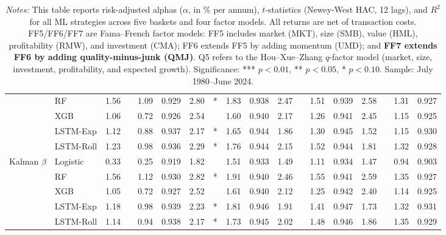 \begin{table}[htbp]
{\begin{tabular}{l l r l r r r l r r r l r r r l r r}
 & RF & 1.56 &  & 1.09 & 0.929 & 2.80 & * & 1.83 & 0.938 & 2.47 &  & 1.51 & 0.939 & 2.58 &  & 1.31 & 0.927 \\
 & XGB & 1.06 &  & 0.72 & 0.926 & 2.54 &  & 1.60 & 0.940 & 2.17 &  & 1.26 & 0.941 & 2.45 &  & 1.15 & 0.925 \\
 & LSTM-Exp & 1.12 &  & 0.88 & 0.937 & 2.17 & * & 1.65 & 0.944 & 1.86 &  & 1.30 & 0.945 & 1.52 &  & 1.15 & 0.930 \\
 & LSTM-Roll & 1.23 &  & 0.98 & 0.936 & 2.29 & * & 1.76 & 0.944 & 2.15 &  & 1.52 & 0.944 & 1.81 &  & 1.32 & 0.928 \\
\midrule
Kalman $\beta$ & Logistic & 0.33 &  & 0.25 & 0.919 & 1.82 &  & 1.51 & 0.933 & 1.49 &  & 1.11 & 0.934 & 1.47 &  & 0.94 & 0.903 \\
 & RF & 1.56 &  & 1.12 & 0.930 & 2.82 & * & 1.91 & 0.940 & 2.46 &  & 1.55 & 0.941 & 2.59 &  & 1.35 & 0.927 \\
 & XGB & 1.05 &  & 0.72 & 0.927 & 2.52 &  & 1.61 & 0.940 & 2.12 &  & 1.25 & 0.942 & 2.40 &  & 1.14 & 0.925 \\
 & LSTM-Exp & 1.18 &  & 0.98 & 0.939 & 2.23 & * & 1.81 & 0.946 & 1.91 &  & 1.41 & 0.947 & 1.73 &  & 1.32 & 0.931 \\
 & LSTM-Roll & 1.14 &  & 0.94 & 0.938 & 2.17 & * & 1.73 & 0.945 & 2.02 &  & 1.48 & 0.946 & 1.86 &  & 1.35 & 0.929 \\
\bottomrule
\end{tabular}%
}
\caption*{\scriptsize \textit{Notes:} This table reports risk-adjusted alphas ($\alpha$, in \% per annum), $t$-statistics (Newey-West HAC, 12 lags), and $R^2$ for all ML strategies across five baskets and four factor models. All returns are net of transaction costs. FF5/FF6/FF7 are Fama--French factor models: FF5 includes market (MKT), size (SMB), value (HML), profitability (RMW), and investment (CMA); FF6 extends FF5 by adding momentum (UMD); and \textbf{FF7 extends FF6 by adding quality-minus-junk (QMJ)}. Q5 refers to the Hou--Xue--Zhang $q$-factor model (market, size, investment, profitability, and expected growth). Significance: *** $p<0.01$, ** $p<0.05$, * $p<0.10$. Sample: July 1980--June 2024.}
\end{table}